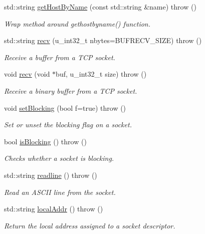 \begin{CompactItemize}
std::string \hyperlink{classSocket_a87721ea6aaa95397bca49ed7c45b897}{getHostByName} (const std::string \&name)  throw ()
\begin{CompactList}\small\item\em Wrap method around gethostbyname() function. \item\end{CompactList}\item 
std::string \hyperlink{classSocket_57cc2a29735f60474e5f274db39c9e0c}{recv} (u\_\-int32\_\-t nbytes=BUFRECV\_\-SIZE)  throw ()
\begin{CompactList}\small\item\em Receive a buffer from a TCP socket. \item\end{CompactList}\item 
void \hyperlink{classSocket_21a85ab2cc66b4e6f399c6b119f8263d}{recv} (void $\ast$buf, u\_\-int32\_\-t size)  throw ()
\begin{CompactList}\small\item\em Receive a binary buffer from a TCP socket. \item\end{CompactList}\item 
void \hyperlink{classSocket_cb7309a2f56ab9ed7769dccb39178200}{setBlocking} (bool f=true)  throw ()
\begin{CompactList}\small\item\em Set or unset the blocking flag on a socket. \item\end{CompactList}\item 
bool \hyperlink{classSocket_b09cfdaf17af3afd7c9cd7324aee9789}{isBlocking} ()  throw ()
\begin{CompactList}\small\item\em Checks whether a socket is blocking. \item\end{CompactList}\item 
std::string \hyperlink{classSocket_8e6666aa80f6b3be532f382c8fe52a57}{readline} ()  throw ()
\begin{CompactList}\small\item\em Read an ASCII line from the socket. \item\end{CompactList}\item 
std::string \hyperlink{classSocket_43966682734e24ae021c9ab21b69d9f7}{localAddr} ()  throw ()
\begin{CompactList}\small\item\em Return the local address assigned to a socket descriptor. \item\end{CompactList}\item 

\end{CompactItemize}
